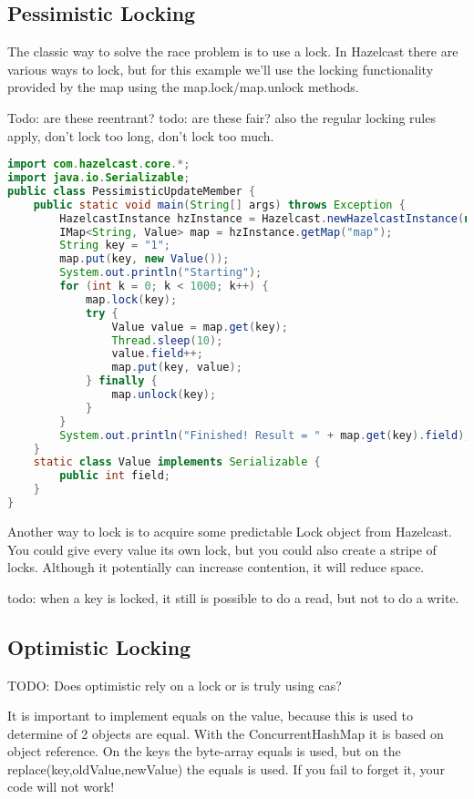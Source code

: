 \subsection{Pessimistic Locking}
The classic way to solve the race problem is to use a lock. In Hazelcast there are various ways to lock, but for this example we'll use the locking functionality provided by the map using the map.lock/map.unlock methods.

Todo: are these reentrant?
todo: are these fair?
also the regular locking rules apply, don't lock too long, don't lock too much.

\begin{lstlisting}[language=java]
import com.hazelcast.core.*;
import java.io.Serializable;
public class PessimisticUpdateMember {
    public static void main(String[] args) throws Exception {
        HazelcastInstance hzInstance = Hazelcast.newHazelcastInstance(null);
        IMap<String, Value> map = hzInstance.getMap("map");
        String key = "1";
        map.put(key, new Value());
        System.out.println("Starting");
        for (int k = 0; k < 1000; k++) {
            map.lock(key);
            try {
                Value value = map.get(key);
                Thread.sleep(10);
                value.field++;
                map.put(key, value);
            } finally {
                map.unlock(key);
            }
        }
        System.out.println("Finished! Result = " + map.get(key).field);
    }
    static class Value implements Serializable {
        public int field;
    }
}
\end{lstlisting}
Another way to lock is to acquire some predictable Lock object from Hazelcast. You could give every value its own lock, but you could also create a stripe of locks. Although it potentially can increase contention, it will reduce space.

todo: when a key is locked, it still is possible to do a read, but not to do a write.

\subsection{Optimistic Locking}
TODO: Does optimistic rely on a lock or is truly using cas?

It is important to implement equals on the value, because this is used to determine of 2 objects are equal. With the ConcurrentHashMap it is based on object reference. On the keys the byte-array equals is used, but on the replace(key,oldValue,newValue) the equals is used. If you fail to forget it, your code will not work!

